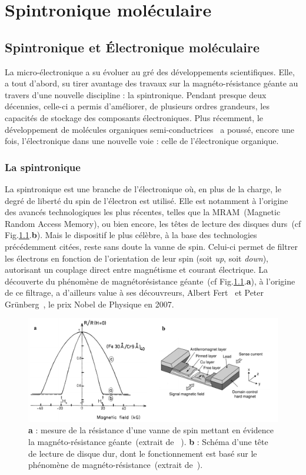 \chapter{Spintronique moléculaire}

\section{Spintronique et Électronique moléculaire}
La micro-électronique a su évoluer au gré des développements scientifiques. Elle, a tout d'abord, su tirer avantage des travaux sur la magnéto-résistance géante au travers d'une nouvelle discipline : la spintronique. Pendant presque deux décennies, celle-ci a permis d'améliorer, de plusieurs ordres grandeurs, les capacités de stockage des composants électroniques. Plus récemment, le développement de molécules organiques semi-conductrices~\cite{Tsumura1986,Horowitz1990,Lin1997} a poussé, encore une fois, l'électronique dans une nouvelle voie : celle de l'électronique organique.

\subsection{La spintronique}
La spintronique est une branche de l'électronique où, en plus de la charge, le degré de liberté du spin de l'électron est utilisé. Elle est notamment à l'origine des avancés technologiques les plus récentes, telles que la MRAM~(Magnetic Random Access Memory), ou bien encore, les têtes de lecture des disques durs~(cf Fig.\ref{SpinValve}.\textbf{b}). Mais le dispositif le plus célèbre, à la base des technologies précédemment citées, reste sans doute la vanne de spin. Celui-ci permet de filtrer les électrons en fonction de l'orientation de leur spin (soit \textit{up}, soit \textit{down}), autorisant un couplage direct entre magnétisme et courant électrique. La découverte du phénomène de magnétorésistance géante~(cf Fig.\ref{SpinValve}.\textbf{a}), à l'origine de ce filtrage, a d'ailleurs value à ses découvreurs, Albert Fert~\cite{Baibich1988} et Peter Grünberg~\cite{Gruenberg1986}, le prix Nobel de Physique en 2007.

\begin{figure}
\centering \includegraphics[scale=0.45]{Spintronique/SpinValve/SpinValve.pdf}
\caption{\textbf{a} : mesure de la résistance d'une vanne de spin mettant en évidence la magnéto-résistance géante~(extrait de ~\cite{Baibich1988}).  \textbf{b} : Schéma d'une tête de lecture de disque dur, dont le fonctionnement est basé sur le phénomène de magnéto-résistance~(extrait de~\cite{Hitoshi2001}).}
\label{SpinValve}
\end{figure}



